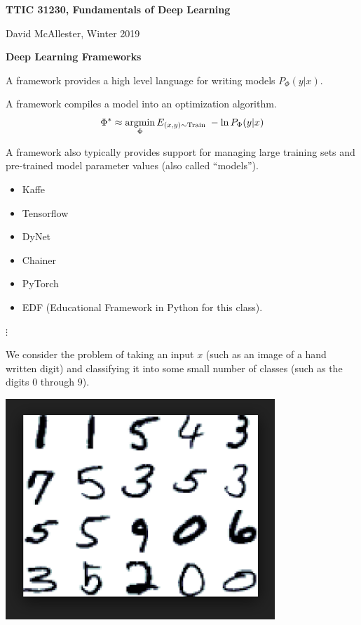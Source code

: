 




{\Huge
  
  \centerline{\bf TTIC 31230, Fundamentals of Deep Learning}
  \bigskip
  \centerline{David McAllester, Winter 2019}
  \vfill
  \vfill
  \centerline{\bf Deep Learning Frameworks}
  \vfill
  \vfill


A framework provides a high level language for writing models $P_\Phi(y|x)$.

\vfill
A framework compiles a model into an optimization algorithm.
\vfill
{\color{red} $$\Phi^* \approx \operatorname*{argmin}_\Phi E_{(x,y) \sim \mathrm{Train}} \; -\ln P_\Phi(y|x)$$}

\vfill
A framework also typically provides support for managing large training sets and pre-trained model parameter values (also called ``models'').


\begin{itemize}
  
\item Kaffe

\vfill

\item Tensorflow

\vfill

\item DyNet

  \vfill
\item Chainer

\vfill

\item PyTorch

  \vfill

\item EDF (Educational Framework in Python for this class).
\end{itemize}

$\vdots$


We consider the problem of taking an input $x$ (such as an image of a hand written digit) and classifying it into some small number of classes (such as the digits $0$ through $9$).

\vfill
\centerline{\includegraphics[width= 4.0in]{../images/MNIST}}
  
}
